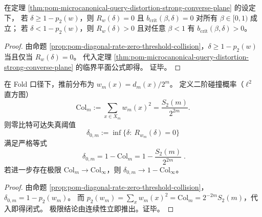 

\begin{corollary}\label{cor:pom-query-distortion-zero-bit-corridor}
在定理 \ref{thm:pom-microcanonical-query-distortion-strong-converse-plane} 的设定下，
若 \(\delta\ge 1-p_2(w)\)，则 \(R_w(\delta)=0\) 且 \(b_{\mathrm{crit}}(\beta,\delta)=0\) 对所有 \(\beta\in[0,1)\) 成立；
若 \(\delta<1-p_2(w)\)，则 \(R_w(\delta)>0\) 且对任意 \(\beta<1\) 有 \(b_{\mathrm{crit}}(\beta,\delta)>0\)。
\end{corollary}
\begin{proof}
由命题 \ref{prop:pom-diagonal-rate-zero-threshold-collision}，\(\delta\ge 1-p_2(w)\) 当且仅当 \(R_w(\delta)=0\)。
代入定理 \ref{thm:pom-microcanonical-query-distortion-strong-converse-plane} 的临界平面公式即得。
证毕。
\end{proof}

\begin{corollary}\label{cor:pom-query-distortion-zero-bit-threshold-auditable}
在 Fold 口径下，推前分布为 \(w_m(x)=d_m(x)/2^m\)。
定义二阶碰撞概率（\(\ell^2\) 直方图）
\[
\mathrm{Col}_m:=\sum_{x\in X_m}w_m(x)^2=\frac{S_2(m)}{2^{2m}}.
\]
则零比特可达失真阈值
\[
\delta_{0,m}:=\inf\{\delta:\ R_{w_m}(\delta)=0\}
\]
满足严格等式
\[
\boxed{\;
\delta_{0,m}=1-\mathrm{Col}_m
=1-\frac{S_2(m)}{2^{2m}}\; } .
\]
若进一步存在极限 \(\mathrm{Col}_m\to \mathrm{Col}_\infty\)，则 \(\delta_{0,m}\to 1-\mathrm{Col}_\infty\)。
\end{corollary}
\begin{proof}
由命题 \ref{prop:pom-diagonal-rate-zero-threshold-collision}，
\(
\delta_{0,m}=1-p_2(w_m)
\)。
而 \(p_2(w_m)=\sum_x w_m(x)^2=\mathrm{Col}_m=2^{-2m}S_2(m)\)，代入即得闭式。
极限结论由连续性立即推出。证毕。
\end{proof}

